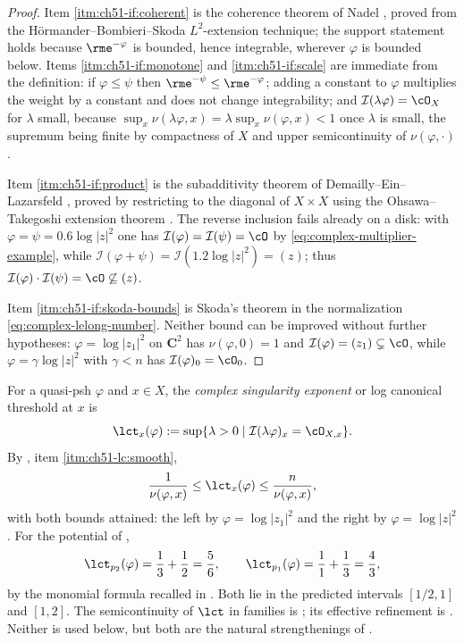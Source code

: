 \begin{proof}
Item \cref{itm:ch51-if:coherent} is the coherence theorem of Nadel
\cite{Nad89,Nad90}, proved from the H\"ormander--Bombieri--Skoda
\(L^2\)-extension technique; the support statement holds because
\(\rme^{-\varphi}\) is bounded, hence integrable, wherever \(\varphi\) is
bounded below.  Items \cref{itm:ch51-if:monotone} and
\cref{itm:ch51-if:scale} are immediate from the definition: if
\(\varphi\leq\psi\) then \(\rme^{-\psi}\leq\rme^{-\varphi}\); adding a
constant to \(\varphi\) multiplies the weight by a constant and does not
change integrability; and \(\mathcal I(\lambda\varphi)=\cO_X\) for
\(\lambda\) small, because \(\sup_x\nu(\lambda\varphi,x)
=\lambda\sup_x\nu(\varphi,x)<1\) once \(\lambda\) is small, the supremum
being finite by compactness of \(X\) and upper semicontinuity of
\(\nu(\varphi,\cdot)\).

Item \cref{itm:ch51-if:product} is the subadditivity theorem of
Demailly--Ein--Lazarsfeld \cite{DEL00}, proved by restricting to the
diagonal of \(X\times X\) using the Ohsawa--Takegoshi extension theorem
\cite{OT87}.  The reverse inclusion fails already on a disk: with
\(\varphi=\psi=0.6\log|z|^2\) one has
\(\mathcal I(\varphi)=\mathcal I(\psi)=\cO\) by
\eqref{eq:complex-multiplier-example}, while
\(\mathcal I(\varphi+\psi)=\mathcal I(1.2\log|z|^2)=(z)\); thus
\(\mathcal I(\varphi)\cdot\mathcal I(\psi)=\cO\not\subseteq(z)\).

Item \cref{itm:ch51-if:skoda-bounds} is Skoda's theorem \cite{Sko72} in the
normalization \eqref{eq:complex-lelong-number}.  Neither bound can be
improved without further hypotheses: \(\varphi=\log|z_1|^2\) on
\(\mathbf C^2\) has \(\nu(\varphi,0)=1\) and
\(\mathcal I(\varphi)=(z_1)\subsetneq\cO\), while
\(\varphi=\gamma\log|z|^2\) with \(\gamma<n\) has
\(\mathcal I(\varphi)_0=\cO_0\).
\end{proof}

\begin{example}
\label{ex:ch51-lct}
For a quasi-psh \(\varphi\) and \(x\in X\), the \emph{complex singularity
exponent} or log canonical threshold at \(x\) is
\[
 \lct_x(\varphi)
 :=\sup\{\lambda>0\mid \mathcal I(\lambda\varphi)_x=\cO_{X,x}\}.
\]
By , item \cref{itm:ch51-lc:smooth},
\[
 \frac{1}{\nu(\varphi,x)}\leq\lct_x(\varphi)\leq
 \frac{n}{\nu(\varphi,x)},
\]
with both bounds attained: the left by \(\varphi=\log|z_1|^2\) and the
right by \(\varphi=\log|z|^2\).  For the potential of
,
\[
 \lct_{p_2}(\varphi)=\frac13+\frac12=\frac56,
 \qquad
 \lct_{p_1}(\varphi)=\frac11+\frac13=\frac43 ,
\]
by the monomial formula recalled in .  Both lie in
the predicted intervals \([1/2,1]\) and \([1,2]\).  The
semicontinuity of \(\lct\) in families is \cite{DK01}; its
effective refinement is \cite{Hiep14}.  Neither is used below, but both
are the natural strengthenings of .
\end{example}

